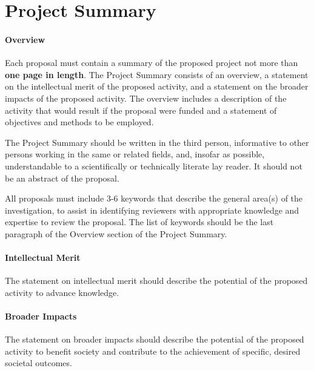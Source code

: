 \section*{Project Summary}

\paragraph*{Overview}
Each proposal must contain a summary of the proposed project not more than {\bf one page in length}. The Project
Summary consists of an overview, a statement on the intellectual merit of the proposed activity, and a statement
on the broader impacts of the proposed activity.
The overview includes a description of the activity that would result if the proposal were funded and a statement
of objectives and methods to be employed.

The Project Summary should be written in the third person, informative to other persons working in
the same or related fields, and, insofar as possible, understandable to a scientifically or technically
literate lay reader. It should not be an abstract of the proposal.


All proposals must include 3-6 keywords that describe the general
area(s) of the investigation, to assist in identifying reviewers with
appropriate knowledge and expertise to review the proposal. The list
of keywords should be the last paragraph of the Overview section of
the Project Summary.

\iflater{}\fi

\paragraph*{Intellectual Merit}
The statement on intellectual merit should describe the potential of the proposed activity to advance knowledge.

\paragraph*{Broader Impacts}
The statement on broader impacts should describe the potential of the proposed activity to benefit society and contribute to the achievement of specific, desired societal outcomes.
